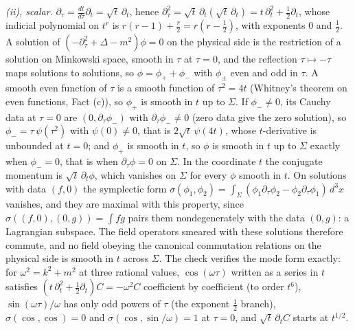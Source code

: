 \emph{(ii), scalar.} $\partial_{\tau} = \tfrac{dt}{d\tau}\partial_{t} = \sqrt{t}\,\partial_{t}$, hence $\partial_{\tau}^{2} = \sqrt{t}\,\partial_{t}(\sqrt{t}\,\partial_{t}) = t\,\partial_{t}^{2} + \tfrac12\partial_{t}$, whose indicial polynomial on $t^{r}$ is $r(r - 1) + \tfrac{r}{2} = r(r - \tfrac12)$, with exponents $0$ and $\tfrac12$. A solution of $(-\partial_{\tau}^{2} + \Delta - m^{2})\phi = 0$ on the physical side is the restriction of a solution on Minkowski space, smooth in $\tau$ at $\tau = 0$, and the reflection $\tau \mapsto -\tau$ maps solutions to solutions, so $\phi = \phi_{+} + \phi_{-}$ with $\phi_{\pm}$ even and odd in $\tau$. A smooth even function of $\tau$ is a smooth function of $\tau^{2} = 4t$ (Whitney's theorem on even functions, Fact (c)), so $\phi_{+}$ is smooth in $t$ up to $\Sigma$. If $\phi_{-} \neq 0$, its Cauchy data at $\tau = 0$ are $(0, \partial_{\tau}\phi_{-})$ with $\partial_{\tau}\phi_{-} \neq 0$ (zero data give the zero solution), so $\phi_{-} = \tau\,\psi(\tau^{2})$ with $\psi(0) \neq 0$, that is $2\sqrt{t}\,\psi(4t)$, whose $t$-derivative is unbounded at $t = 0$; and $\phi_{+}$ is smooth in $t$, so $\phi$ is smooth in $t$ up to $\Sigma$ exactly when $\phi_{-} = 0$, that is when $\partial_{\tau}\phi = 0$ on $\Sigma$. In the coordinate $t$ the conjugate momentum is $\sqrt{t}\,\partial_{t}\phi$, which vanishes on $\Sigma$ for every $\phi$ smooth in $t$. On solutions with data $(f, 0)$ the symplectic form $\sigma(\phi_{1}, \phi_{2}) = \int_{\Sigma}(\phi_{1}\partial_{\tau}\phi_{2} - \phi_{2}\partial_{\tau}\phi_{1})\,d^{3}x$ vanishes, and they are maximal with this property, since $\sigma((f, 0), (0, g)) = \int fg$ pairs them nondegenerately with the data $(0, g)$: a Lagrangian subspace. The field operators smeared with these solutions therefore commute, and no field obeying the canonical commutation relations on the physical side is smooth in $t$ across $\Sigma$. The check verifies the mode form exactly: for $\omega^{2} = k^{2} + m^{2}$ at three rational values, $\cos(\omega\tau)$ written as a series in $t$ satisfies $(t\,\partial_{t}^{2} + \tfrac12\partial_{t})C = -\omega^{2}C$ coefficient by coefficient (to order $t^{6}$), $\sin(\omega\tau)/\omega$ has only odd powers of $\tau$ (the exponent $\tfrac12$ branch), $\sigma(\cos, \cos) = 0$ and $\sigma(\cos, \sin/\omega) = 1$ at $\tau = 0$, and $\sqrt{t}\,\partial_{t}C$ starts at $t^{1/2}$.

